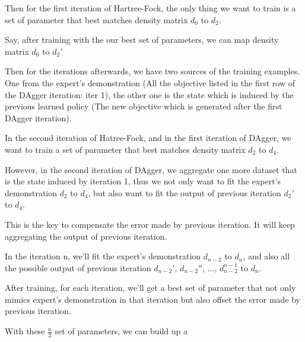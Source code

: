 \documentclass[twoside]{article}
\begin{document}
Then for the first iteration of Hartree-Fock, the only thing we want to train is a set of parameter that best matches density matrix $d_0$ to $d_2$. 


Say, after training with the our best set of parameters, we can map density matrix $d_0$ to $d_{2}'$

Then for the iterations afterwards, we have two sources of the training examples. 
One from the expert's demonstration (All the objective listed in the first row of the DAgger iteration: iter 1), the other one is the state which is induced by the previous learned policy (The new objective which is generated after the first DAgger iteration).

In the second iteration of Hatree-Fock, and in the first iteration of DAgger, 
we want to train a set of parameter that best matches density matrix $d_2$ to $d_4$.

However, in the second iteration of DAgger, we aggregate one more dataset that is the state induced by iteration 1,
thus we not only want to fit the expert's demonstration $d_2$ to $d_4$, but also want to fit the output of previous iteration $d_{2}'$ to $d_4$.

This is the key to compensate the error made by previous iteration.
It will keep aggregating the output of previous iteration.

In the iteration n,  we'll fit the expert's demonstration $d_{n-2}$ to $d_n$, and also all the possible output of previous iteration $d_{n-2}'$,  $d_{n-2}''$, $\ldots$,  $d_{n-2}^{n-1}$  to $d_n$.

After training, for each iteration, we'll get a best set of parameter that not only mimics expert's demonstration in that iteration but also offset the error made by previous iteration.


With these $\frac{n}{2}$ set of parameters, we can build up a 
\end{document}
